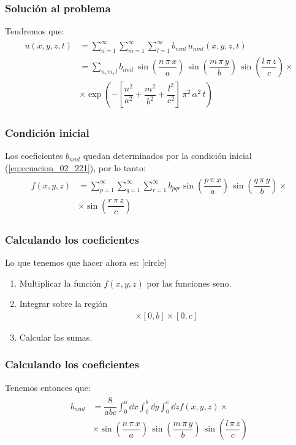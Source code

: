 \begin{frame}
\frametitle{Solución al problema}
Tendremos que:
\fontsize{12}{12}\selectfont
\begin{align}
\begin{aligned}
u(x, y, z, t) &= \sum_{n=1}^{\infty} \sum_{m=1}^{\infty} \sum_{l=1}^{\infty} b_{nml} \, u_{nml}(x, y, z, t) \\[1em]
&= \sum_{n,m,l} b_{nml} \, \sin \left(\dfrac{n \, \pi \, x}{a} \right) \, \sin \left( \dfrac{m \, \pi \, y}{b} \right) \, \sin \left( \dfrac{l \, \pi \, z}{c} \right) \times \\[1em]
&\times \exp \left( - \left[ \dfrac{n^{2}}{a^{2}} + \dfrac{m^{2}}{b^{2}} + \dfrac{l^{2}}{c^{2}} \right] \, \pi^{2} \, \alpha^{2}\, t \right)
\end{aligned}
\label{eq:ecuacion_02_241}
\end{align}
\end{frame}
\begin{frame}
\frametitle{Condición inicial}
Los coeficientes $b_{nml}$ quedan determinados por la condición inicial (\ref{eq:ecuacion_02_221}), por lo tanto:
\begin{align}
\begin{aligned}
f(x, y, z) &= \sum_{p=1}^{\infty} \sum_{q=1}^{\infty} \sum_{r=1}^{\infty} b_{pqr} \sin \left( \dfrac{p \, \pi \, x}{a} \right) \, \sin \left( \dfrac{q \, \pi \, y}{b} \right) \times \\[1em]
&\times \sin \left( \dfrac{r \, \pi \, z}{c} \right)
\end{aligned}
\label{eq:ecuacion_02_242}
\end{align}
\end{frame}
\begin{frame}
\frametitle{Calculando los coeficientes}
Lo que tenemos que hacer ahora es:
[circle]
\begin{enumerate}[<+->]
\item Multiplicar la función $f(x,y,z)$ por las funciones seno.
\item Integrar sobre la región
\begin{align*}
[0, a] \times [0, b] \times [0, c]
\end{align*}
\item Calcular las sumas.
\end{enumerate}
\end{frame}
\begin{frame}
\frametitle{Calculando los coeficientes}
Tenemos entonces que:
\begin{align}
\begin{aligned}
b_{nml} &= \dfrac{8}{abc} \int_{0}^{a} \dd{x} \int_{0}^{b} \dd{y} \int_{0}^{c} \dd{z} f(x, y, z) \times \\[1em]
&\times \sin \left( \dfrac{n \, \pi \, x}{a} \right) \, \sin \left( \dfrac{m \, \pi \, y}{b} \right) \, \sin \left( \dfrac{l \, \pi \, z}{c} \right)
\end{aligned}
\label{eq:ecuacion_02_243}
\end{align}
\end{frame}
